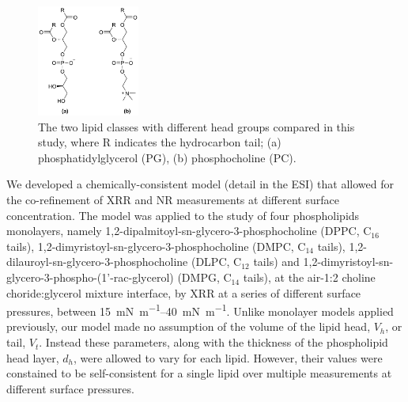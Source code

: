 \documentclass[%
 reprint,
 amsmath,amssymb,
 prl,
]{revtex4-1}
\begin{document}
%
\begin{figure}[b]
\includegraphics[width=0.3\textwidth]{figures/head_groups}
\caption{\label{fig:heads} The two lipid classes with different head groups compared in this study, where R indicates the hydrocarbon tail; (a) phosphatidylglycerol (PG), (b) phosphocholine (PC).}
\end{figure}
%
We developed a chemically-consistent model (detail in the ESI) that allowed for the co-refinement of XRR and NR measurements at different surface concentration.
The model was applied to the study of four phospholipids monolayers, namely 1,2-dipalmitoyl-sn-glycero-3-phosphocholine (DPPC, C$_{16}$ tails), 1,2-dimyristoyl-sn-glycero-3-phosphocholine (DMPC, C$_{14}$ tails),  1,2-dilauroyl-sn-glycero-3-phosphocholine (DLPC, C$_{12}$ tails) and 1,2-dimyristoyl-sn-glycero-3-phospho-(1'-rac-glycerol) (DMPG, C$_{14}$ tails), at the air-1:2 choline choride:glycerol mixture interface, by XRR at a series of different surface pressures, between \SIrange{15}{40}{\milli\newton\per\meter}.
Unlike monolayer models applied previously\cite{Mohwald1990,Kewalramani2010,Bayerl1990,Johnson1991,Clifton2012,Helm1987,Daillant1990}, our model made no assumption of the volume of the lipid head, $V_h$, or tail, $V_t$.
Instead these parameters, along with the thickness of the phospholipid head layer, $d_h$, were allowed to vary for each lipid.
However, their values were constained to be self-consistent for a single lipid over multiple measurements at different surface pressures.
\end{document}
